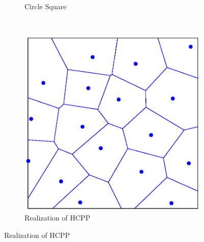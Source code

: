 \documentclass{beamer}
\theoremstyle{remark}
\begin{document}
\begin{frame}
\begin{figure}
\begin{subfigure}{0.33\columnwidth}
\caption{Circle Square }
\end{subfigure}~
\begin{subfigure}{0.33\columnwidth}
\includegraphics[width=\columnwidth]{c4_deploy_hcpp}
\caption{Realization of HCPP}
\end{subfigure}
\end{figure}
\end{frame}
\end{document}
